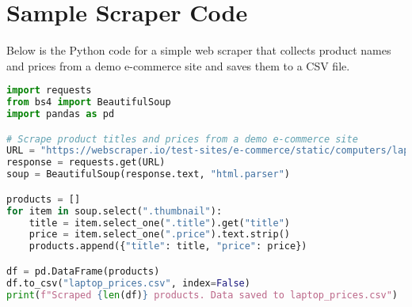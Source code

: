 \documentclass[10pt,a4paper]{article}
\begin{document}
\section*{Sample Scraper Code}
Below is the Python code for a simple web scraper that collects product names and prices from a demo e-commerce site and saves them to a CSV file.

\begin{lstlisting}[language=Python, basicstyle=\ttfamily\small, backgroundcolor=\color{gray!10}, frame=single]
import requests
from bs4 import BeautifulSoup
import pandas as pd

# Scrape product titles and prices from a demo e-commerce site
URL = "https://webscraper.io/test-sites/e-commerce/static/computers/laptops"
response = requests.get(URL)
soup = BeautifulSoup(response.text, "html.parser")

products = []
for item in soup.select(".thumbnail"):
    title = item.select_one(".title").get("title")
    price = item.select_one(".price").text.strip()
    products.append({"title": title, "price": price})

df = pd.DataFrame(products)
df.to_csv("laptop_prices.csv", index=False)
print(f"Scraped {len(df)} products. Data saved to laptop_prices.csv")
\end{lstlisting}
\end{document}
